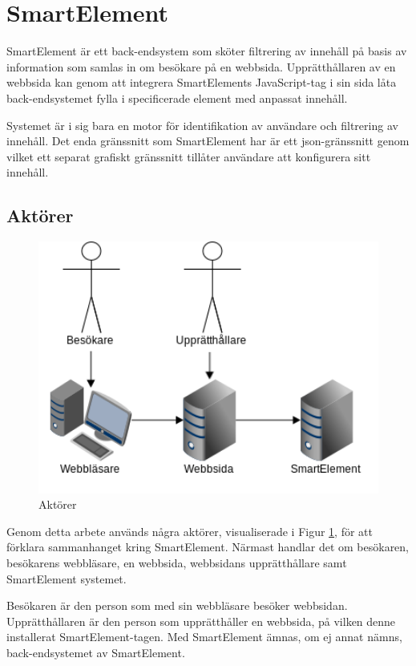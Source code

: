 \section{SmartElement}

SmartElement är ett back-endsystem som sköter filtrering av innehåll på basis av information som samlas in om besökare på en webbsida. Upprätthållaren av en webbsida kan genom att integrera SmartElements JavaScript-tag i sin sida låta back-endsystemet fylla i specificerade element med anpassat innehåll.

Systemet är i sig bara en motor för identifikation av användare och filtrering av innehåll. Det enda gränssnitt som SmartElement har är ett \gls{json}-gränssnitt genom vilket ett separat grafiskt gränssnitt tillåter användare att konfigurera sitt innehåll.

\subsection{Aktörer}

\begin{figure}[h!]
\centering
\includegraphics[width=150mm]{assets/images/smeleactors.png}
\caption{Aktörer}
\label{actors}
\end{figure}

Genom detta arbete används några aktörer, visualiserade i Figur \ref{actors}, för att förklara sammanhanget kring SmartElement. Närmast handlar det om besökaren, besökarens webbläsare, en webbsida, webbsidans upprätthållare samt SmartElement systemet.

Besökaren är den person som med sin webbläsare besöker webbsidan. Upprätthållaren är den person som upprätthåller en webbsida, på vilken denne installerat SmartElement-tagen. Med SmartElement ämnas, om ej annat nämns, back-endsystemet av SmartElement.

